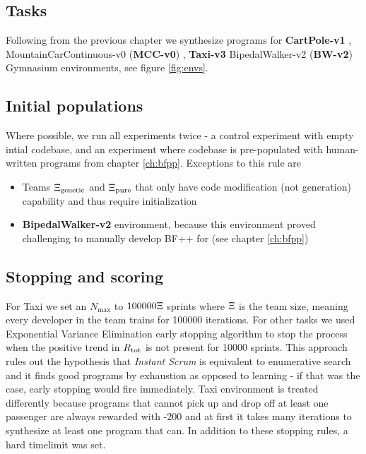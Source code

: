 \subsection{Tasks}
\label{sec:tasks}

Following from the previous chapter we synthesize programs for \textbf{CartPole-v1} \cite{cartpole}, MountainCarContinuous-v0 (\textbf{MCC-v0}) \cite{mountain_car}, \textbf{Taxi-v3} \cite{taxi} BipedalWalker-v2 (\textbf{BW-v2})  Gymnasium \cite{towersGymnasiumStandardInterface2024} environments, see figure \ref{fig:envs}.

\subsection{Initial populations}

Where possible, we run all experiments twice - a control experiment with empty intial codebase, and an experiment where codebase is pre-populated with human-written programs from chapter \ref{ch:bfpp}.
Exceptions to this rule are 
\begin{itemize}
    \item Teams $\Xi_\text{genetic}$ and $\Xi_\text{pure}$ that only have code modification (not generation) capability and thus require initialization 
    \item \textbf{BipedalWalker-v2} environment, because this environment proved challenging to manually develop BF++ for (see chapter \ref{ch:bfpp})
\end{itemize}

\subsection{Stopping and scoring}

For Taxi we set an $N_\text{max}$ to $100000 \Xi$ sprints where $\Xi$ is the team size, meaning every developer in the team trains for 100000 iterations.
For other tasks we used Exponential Variance Elimination \cite{evestop} early stopping algorithm to stop the process when the positive trend in $R_\text{tot}$ is not present for 10000 sprints.
This approach rules out the hypothesis that \emph{Instant Scrum} is equivalent to enumerative search and it finds good programs by exhaustion as opposed to learning - if that was the case, early stopping would fire immediately.
Taxi environment is treated differently because programs that cannot pick up and drop off at least one passenger are always rewarded with -200 and at first it takes many iterations to synthesize at least one program that can.
In addition to these stopping rules, a hard timelimit was set.

